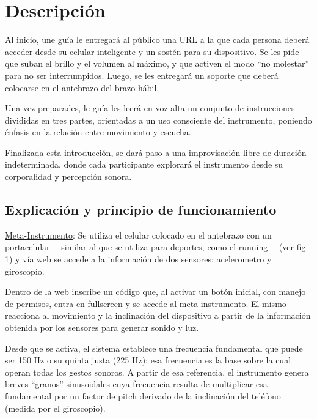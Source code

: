 \documentclass[spanish]{report}
\newcommand{\sectionsep}{1cm}
\begin{document}
\vspace{\sectionsep}
\section{Descripción}
Al inicio, une guía le entregará al público una URL a la que cada persona deberá acceder desde su celular inteligente y un sostén para su dispositivo. Se les pide que suban el brillo y el volumen al máximo, y que activen el modo “no molestar” para no ser interrumpidos. Luego, se les entregará un soporte que deberá colocarse en el antebrazo del brazo hábil.

Una vez preparades, le guía les leerá en voz alta un conjunto de instrucciones divididas en tres partes, orientadas a un uso consciente del instrumento, poniendo énfasis en la relación entre movimiento y escucha.

Finalizada esta introducción, se dará paso a una improvisación libre de duración indeterminada, donde cada participante explorará el instrumento desde su corporalidad y percepción sonora.


\subsection{Explicación y principio de funcionamiento}

\underline{Meta-Instrumento}:
Se utiliza el celular colocado en el antebrazo con un portacelular —similar al que se utiliza para deportes, como el running— (ver fig. 1) y vía web se accede a la información de dos sensores: acelerometro y giroscopio. 

Dentro de la web inscribe un código que, al activar un botón inicial, con manejo de permisos, entra en fullscreen y se accede al meta-instrumento.
El mismo reacciona al movimiento y la inclinación del dispositivo a partir de la información obtenida por los sensores para generar sonido y luz. 

Desde que se activa, el sistema establece una frecuencia fundamental que puede ser 150 Hz o su quinta justa (225 Hz); esa frecuencia es la base sobre la cual operan todas los gestos sonoros. A partir de esa referencia, el instrumento genera breves “granos” sinusoidales cuya frecuencia resulta de multiplicar esa fundamental por un factor de pitch derivado de la inclinación del teléfono (medida por el giroscopio).
\end{document}

